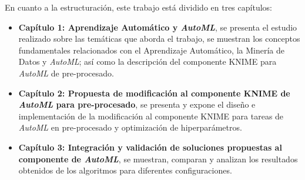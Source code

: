 En cuanto a la estructuración, este trabajo está dividido en tres capítulos:
\begin{itemize}
	\item \textbf{Capítulo 1: Aprendizaje Automático y \textit{AutoML}}, se presenta el estudio realizado sobre las temáticas que aborda el trabajo, se muestran los conceptos fundamentales relacionados con el Aprendizaje Automático, la Minería de Datos y \textit{AutoML}; así como la descripción del componente KNIME para \textit{AutoML} de pre-procesado.
	\item \textbf{Capítulo 2: Propuesta de modificación al componente KNIME de \textit{AutoML} para pre-procesado}, se presenta y expone el diseño e implementación de la modificación al componente KNIME para tareas de \textit{AutoML} en pre-procesado y optimización de hiperparámetros.
		\item \textbf{Capítulo 3: Integración y validación de soluciones propuestas al componente de \textit{AutoML}}, se muestran, comparan y analizan los resultados obtenidos de los algoritmos para diferentes configuraciones.
\end{itemize}







